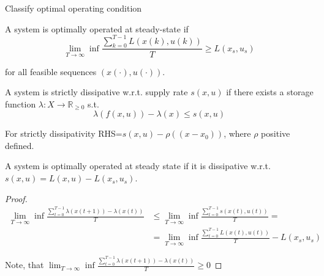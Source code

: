 Classify optimal operating condition

\begin{Definition}
 A system is optimally operated at steady-state if
 $$\lim_{T\rightarrow\infty}\inf\frac{\sum_{k=0}^{T-1}L(x(k),u(k))}{T} \ge L(x_s,u_s)$$

 for all feasible sequences $(x(\cdot), u(\cdot))$.
\end{Definition}

\begin{Definition}
 A system is strictly dissipative w.r.t. supply rate $s(x,u)$ if there exists a storage 
 function $\lambda:X\rightarrow\mathbb{R}_{\ge 0}$ s.t.
 $$\lambda(f(x,u))-\lambda(x)\le s(x,u)$$

 For strictly dissipativity RHS=$s(x,u)-\rho((x-x_0))$, where $\rho$ positive defined.
\end{Definition}

\begin{Theorem}
 A system is optimally operated at steady state if it is dissipative w.r.t.
 $s(x,u)=L(x,u)-L(x_s,u_s)$.
 \begin{proof}
  \begin{equation}
   \begin{split}
    \lim_{T\rightarrow\infty}\inf\frac{\sum_{t=0}^{T-1}\lambda(x(t+1))-\lambda(x(t))}{T} &\le
           \lim_{T\rightarrow\infty}\inf\frac{\sum_{t=0}^{T-1}s(x(t),u(t))}{T}= \\
           &=\lim_{T\rightarrow\infty}\inf\frac{\sum_{t=0}^{T-1}L(x(t),u(t))}{T}-L(x_s,u_s)
   \end{split}
  \end{equation}

  Note, that $\lim_{T\rightarrow\infty}\inf\frac{\sum_{t=0}^{T-1}\lambda(x(t+1))-\lambda(x(t))}{T} \ge 0$
 \end{proof}
\end{Theorem}


